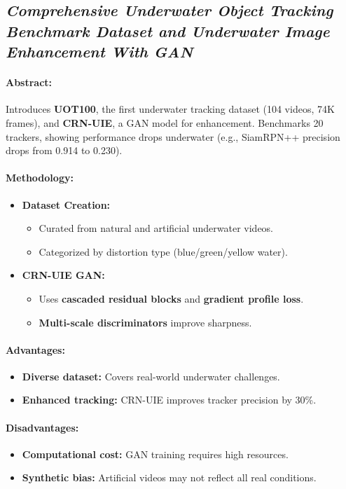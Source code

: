 \subsection{\textit{Comprehensive Underwater Object Tracking Benchmark Dataset and Underwater Image Enhancement With GAN\cite{Panetta_2021}}}

\paragraph{Abstract:}
Introduces \textbf{UOT100}, the first underwater tracking dataset (104 videos, 74K frames), and \textbf{CRN-UIE}, a GAN model for enhancement. Benchmarks 20 trackers, showing performance drops underwater (e.g., SiamRPN++ precision drops from 0.914 to 0.230).

\paragraph{Methodology:}
\begin{itemize}
    \item \textbf{Dataset Creation:}
          \begin{itemize}
              \item Curated from natural and artificial underwater videos.
              \item Categorized by distortion type (blue/green/yellow water).
          \end{itemize}

    \item \textbf{CRN-UIE GAN:}
          \begin{itemize}
              \item Uses \textbf{cascaded residual blocks} and \textbf{gradient profile loss}.
              \item \textbf{Multi-scale discriminators} improve sharpness.
          \end{itemize}
\end{itemize}

\paragraph{Advantages:}
\begin{itemize}
    \item \textbf{Diverse dataset:} Covers real-world underwater challenges.
    \item \textbf{Enhanced tracking:} CRN-UIE improves tracker precision by 30\%.
\end{itemize}

\paragraph{Disadvantages:}
\begin{itemize}
    \item \textbf{Computational cost:} GAN training requires high resources.
    \item \textbf{Synthetic bias:} Artificial videos may not reflect all real conditions.
\end{itemize}